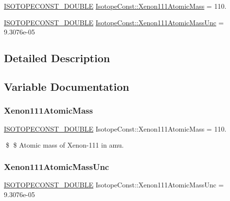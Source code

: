 \begin{DoxyCompactItemize}
\item 
\mbox{\hyperlink{group___isotope_const-_macros_ga8f45a7272ce02c0b4c65c44636ed719a}{I\+S\+O\+T\+O\+P\+E\+C\+O\+N\+S\+T\+\_\+\+D\+O\+U\+B\+LE}} \mbox{\hyperlink{group___isotope_const-_xenon-_xe111_gafb38d9021e51fa2badc872f9e85510b8}{Isotope\+Const\+::\+Xenon111\+Atomic\+Mass}} = 110.
\item 
\mbox{\hyperlink{group___isotope_const-_macros_ga8f45a7272ce02c0b4c65c44636ed719a}{I\+S\+O\+T\+O\+P\+E\+C\+O\+N\+S\+T\+\_\+\+D\+O\+U\+B\+LE}} \mbox{\hyperlink{group___isotope_const-_xenon-_xe111_gae5aac345d7957d26341586f49bd335de}{Isotope\+Const\+::\+Xenon111\+Atomic\+Mass\+Unc}} = 9.\+3076e-\/05
\end{DoxyCompactItemize}


\subsection{Detailed Description}


\subsection{Variable Documentation}
\mbox{\label{group___isotope_const-_xenon-_xe111_gafb38d9021e51fa2badc872f9e85510b8}} 
\subsubsection{\texorpdfstring{Xenon111\+Atomic\+Mass}{Xenon111AtomicMass}}
{\footnotesize\ttfamily \mbox{\hyperlink{group___isotope_const-_macros_ga8f45a7272ce02c0b4c65c44636ed719a}{I\+S\+O\+T\+O\+P\+E\+C\+O\+N\+S\+T\+\_\+\+D\+O\+U\+B\+LE}} Isotope\+Const\+::\+Xenon111\+Atomic\+Mass = 110.}

\$ \$ Atomic mass of Xenon-\/111 in amu. \mbox{\label{group___isotope_const-_xenon-_xe111_gae5aac345d7957d26341586f49bd335de}} 
\subsubsection{\texorpdfstring{Xenon111\+Atomic\+Mass\+Unc}{Xenon111AtomicMassUnc}}
{\footnotesize\ttfamily \mbox{\hyperlink{group___isotope_const-_macros_ga8f45a7272ce02c0b4c65c44636ed719a}{I\+S\+O\+T\+O\+P\+E\+C\+O\+N\+S\+T\+\_\+\+D\+O\+U\+B\+LE}} Isotope\+Const\+::\+Xenon111\+Atomic\+Mass\+Unc = 9.\+3076e-\/05}

